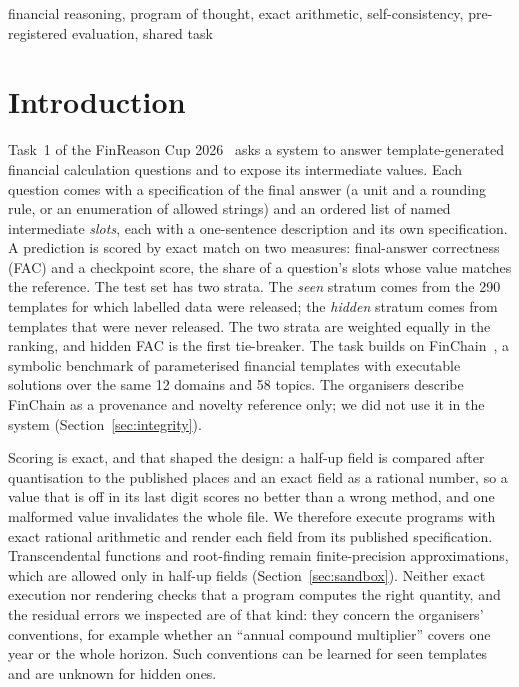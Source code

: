 \documentclass[conference]{IEEEtran}
\begin{document}
\begin{IEEEkeywords}
financial reasoning, program of thought, exact arithmetic, self-consistency, pre-registered evaluation, shared task
\end{IEEEkeywords}

\section{Introduction}
Task~1 of the FinReason Cup 2026~\cite{finreason2026overview,finreason2026task1overview} asks a system to answer template-generated financial calculation questions and to expose its intermediate values. Each question comes with a specification of the final answer (a unit and a rounding rule, or an enumeration of allowed strings) and an ordered list of named intermediate \emph{slots}, each with a one-sentence description and its own specification. A prediction is scored by exact match on two measures: final-answer correctness (FAC) and a checkpoint score, the share of a question's slots whose value matches the reference. The test set has two strata. The \emph{seen} stratum comes from the 290 templates for which labelled data were released; the \emph{hidden} stratum comes from templates that were never released. The two strata are weighted equally in the ranking, and hidden FAC is the first tie-breaker. The task builds on FinChain~\cite{xie-etal-2026-finchain}, a symbolic benchmark of parameterised financial templates with executable solutions over the same 12 domains and 58 topics. The organisers describe FinChain as a provenance and novelty reference only; we did not use it in the system (Section~\ref{sec:integrity}).

Scoring is exact, and that shaped the design: a half-up field is compared after quantisation to the published places and an exact field as a rational number, so a value that is off in its last digit scores no better than a wrong method, and one malformed value invalidates the whole file. We therefore execute programs with exact rational arithmetic and render each field from its published specification. Transcendental functions and root-finding remain finite-precision approximations, which are allowed only in half-up fields (Section~\ref{sec:sandbox}). Neither exact execution nor rendering checks that a program computes the right quantity, and the residual errors we inspected are of that kind: they concern the organisers' conventions, for example whether an ``annual compound multiplier'' covers one year or the whole horizon. Such conventions can be learned for seen templates and are unknown for hidden ones.
\end{document}
